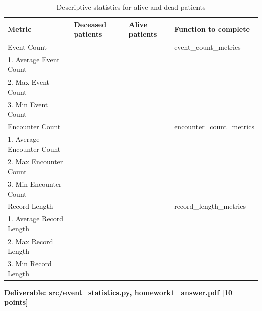 \documentclass[12pt]{article}
\begin{document}
\begin{table}[th]
\centering
\begin{tabular}{@{}l|l|l|l@{}}
\toprule
Metric & Deceased patients & Alive patients & Function to complete \\ \hline
Event Count & & & event\_count\_metrics \\ 
1. Average Event Count &&& \\
2. Max Event Count  &&&\\
3. Min Event Count  &&&\\ \hline

Encounter Count & & & encounter\_count\_metrics \\ 
1. Average Encounter Count  &&&\\
2. Max Encounter Count  &&&\\
3. Min Encounter Count  &&&\\ \hline

Record Length & & & record\_length\_metrics \\ 
1. Average Record Length &&&\\
2. Max Record Length&&& \\
3. Min Record Length&&& \\ 
\bottomrule
\end{tabular}
\caption{Descriptive statistics for alive and dead patients}
\label{tbl:stat}
\end{table} 

\textbf{Deliverable: src/event\_statistics.py, homework1\_answer.pdf  [10 points]}
\end{document}
